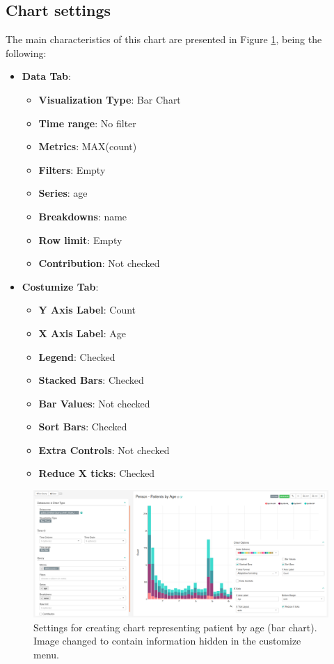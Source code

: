 \documentclass[]{book}
\providecommand{\tightlist}{%
  \setlength{\itemsep}{0pt}\setlength{\parskip}{0pt}}
\begin{document}
\subsection{Chart settings}\label{chart-settings-7}

The main characteristics of this chart are presented in Figure
\ref{fig:personPatientsByAge}, being the following:

\begin{itemize}
\tightlist
\item
  \textbf{Data Tab}:

  \begin{itemize}
  \tightlist
  \item
    \textbf{Visualization Type}: Bar Chart
  \item
    \textbf{Time range}: No filter
  \item
    \textbf{Metrics}: MAX(count)
  \item
    \textbf{Filters}: Empty
  \item
    \textbf{Series}: age
  \item
    \textbf{Breakdowns}: name
  \item
    \textbf{Row limit}: Empty
  \item
    \textbf{Contribution}: Not checked
  \end{itemize}
\item
  \textbf{Costumize Tab}:

  \begin{itemize}
  \tightlist
  \item
    \textbf{Y Axis Label}: Count
  \item
    \textbf{X Axis Label}: Age
  \item
    \textbf{Legend}: Checked
  \item
    \textbf{Stacked Bars}: Checked
  \item
    \textbf{Bar Values}: Not checked
  \item
    \textbf{Sort Bars}: Checked
  \item
    \textbf{Extra Controls}: Not checked
  \item
    \textbf{Reduce X ticks}: Checked
  \end{itemize}
\end{itemize}

\begin{figure}
\includegraphics[width=1\linewidth]{images/personPatientsByAge} \caption{Settings for creating chart representing patient by age (bar chart). Image changed to contain information hidden in the customize menu.}\label{fig:personPatientsByAge}
\end{figure}
\end{document}
